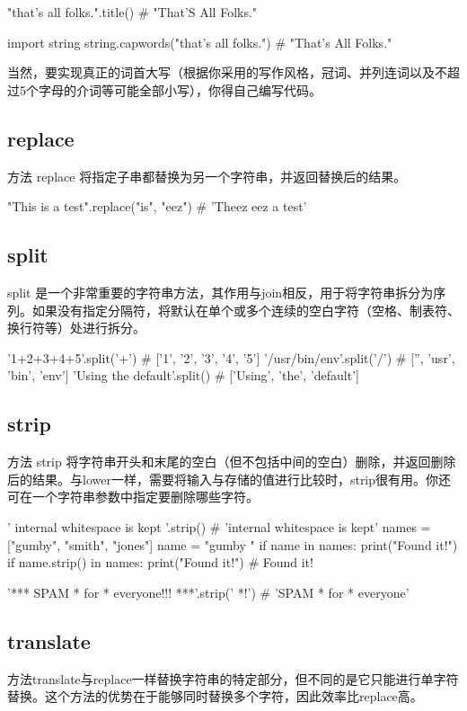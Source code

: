 \begin{pyc}
"that's all folks.".title()  # "That'S All Folks."

import string
string.capwords("that's all folks.")  # "That's All Folks."
\end{pyc}

当然，要实现真正的词首大写（根据你采用的写作风格，冠词、并列连词以及不超过5个字母的介词等可能全部小写），你得自己编写代码。
\subsection{replace}
方法 replace 将指定子串都替换为另一个字符串，并返回替换后的结果。
\begin{pyc}
"This is a test".replace("is", "eez")  # 'Theez eez a test'
\end{pyc}
\subsection{split}
split 是一个非常重要的字符串方法，其作用与join相反，用于将字符串拆分为序列。如果没有指定分隔符，将默认在单个或多个连续的空白字符（空格、制表符、换行符等）处进行拆分。
\begin{pyc}
'1+2+3+4+5'.split('+')
# ['1', '2', '3', '4', '5']
'/usr/bin/env'.split('/')
# ['', 'usr', 'bin', 'env']
'Using the    default'.split()
# ['Using', 'the', 'default']
\end{pyc}
\subsection{strip}
方法 strip 将字符串开头和末尾的空白（但不包括中间的空白）删除，并返回删除后的结果。与lower一样，需要将输入与存储的值进行比较时，strip很有用。你还可在一个字符串参数中指定要删除哪些字符。
\begin{pyc}
' internal whitespace is kept '.strip()
# 'internal whitespace is kept'
names = ["gumby", "smith", "jones"]
name = "gumby "
if name in names:
    print("Found it!")
if name.strip() in names:
    print("Found it!")  # Found it!

'*** SPAM * for * everyone!!! ***'.strip(' *!')  # 'SPAM * for * everyone'
\end{pyc}

\subsection{translate}
方法translate与replace一样替换字符串的特定部分，但不同的是它只能进行单字符替换。这个方法的优势在于能够同时替换多个字符，因此效率比replace高。

